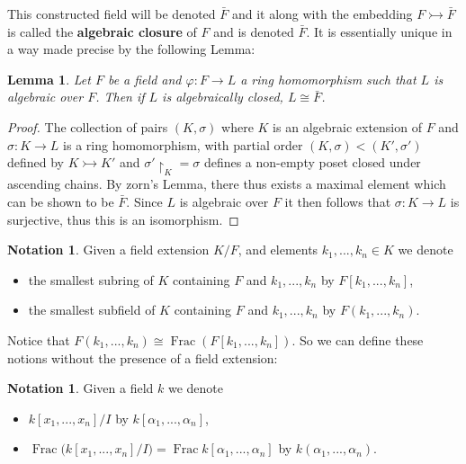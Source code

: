 \documentclass[12pt]{article}
\theoremstyle{plain}
\newtheorem{lemma}[thm]{Lemma}
\theoremstyle{definition}
\newtheorem{notation}[thm]{Notation}
\begin{document}
	This constructed field will be denoted $\bar{F}$ and it along with the embedding $F \rightarrowtail \bar{F}$ is called the \textbf{algebraic closure} of $F$ and is denoted $\bar{F}$. It is essentially unique in a way made precise by the following Lemma:
	\begin{lemma}
		Let $F$ be a field and $\varphi: F \to L$ a ring homomorphism such that $L$ is algebraic over  $F$. Then if $L$ is algebraically closed, $L \cong \bar{F}$.
	\end{lemma}
	\begin{proof}
		The collection of pairs $(K,\sigma)$ where $K$ is an algebraic extension of $F$ and $\sigma: K \to L$ is a ring homomorphism, with partial order $(K,\sigma) < (K',\sigma')$ defined by $K \rightarrowtail K'$ and $\sigma'\restriction_{K} = \sigma$ defines a non-empty poset closed under ascending chains. By zorn's Lemma, there thus exists a maximal element which can be shown to be $\bar{F}$. Since $L$ is algebraic over $F$ it then follows that $\sigma: K \to L$ is surjective, thus this is an isomorphism.
	\end{proof}
	\begin{notation}
		Given a field extension $K/F$, and elements $k_1,...,k_n \in K$ we denote
		\begin{itemize}
			\item the smallest subring of $K$ containing $F$ and $k_1,...,k_n$ by $F[k_1,...,k_n]$,
			\item the smallest subfield of $K$ containing $F$ and $k_1,...,k_n$ by $F(k_1,...,k_n)$.
		\end{itemize}
	\end{notation}
	Notice that $F(k_1,...,k_n) \cong \operatorname{Frac}(F[k_1,...,k_n])$. So we can define these notions without the presence of a field extension:
	\begin{notation}
		\label{not:smstring_smstfield_noext}
		Given a field $k$ we denote
		\begin{itemize}
			\item $k[x_1,...,x_n]/I$ by $k[\alpha_1,...,\alpha_n]$,
			\item $\operatorname{Frac}\big(k[x_1,...,x_n]/I\big) = \operatorname{Frac}k[\alpha_1,...,\alpha_n]$ by $k(\alpha_1,...,\alpha_n)$.
		\end{itemize}
	\end{notation}
	
\end{document}
